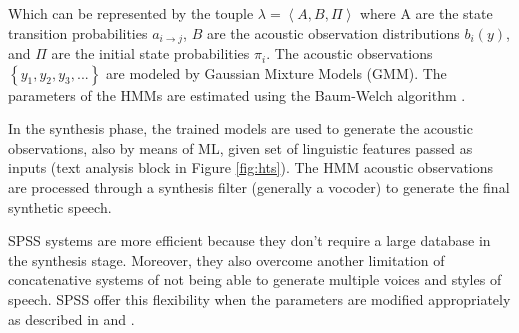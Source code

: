 Which can be represented by the touple $\lambda = \left < A, B, \Pi  \right >$ where A are the state transition probabilities $a_{i \rightarrow j}$, $B$ are the acoustic observation distributions $b_i(y)$, and $\Pi$ are the initial state probabilities $\pi_i$. The acoustic observations $\left \{ y_1, y_2, y_3, ... \right  \}$ are modeled by Gaussian Mixture Models (GMM). The parameters of the HMMs are estimated using the Baum-Welch algorithm \cite{blunsom2004hidden}.

In the synthesis phase, the trained models are used to generate the acoustic observations, also by means of ML, given set of linguistic features passed as inputs (text analysis block in Figure \ref{fig:hts}). The HMM acoustic observations are processed through a synthesis filter (generally a vocoder) to generate the final synthetic speech.

SPSS systems are more efficient because they don't require a large database in the synthesis stage. Moreover, they also overcome another limitation of concatenative systems of not being able to generate multiple voices and styles of speech. SPSS offer this flexibility when the parameters are modified appropriately as described in \cite{pascual2016deep} and \cite{zen2007hmm}.



